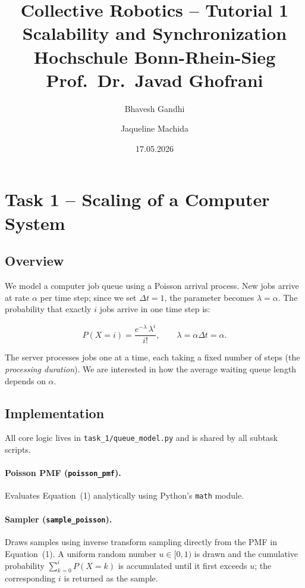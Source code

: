 \documentclass[12pt, a4paper]{article}
\title{
    \vspace{-1cm}
    \textbf{Collective Robotics -- Tutorial 1}\\[0.3em]
    \large Scalability and Synchronization\\[0.5em]
    \normalsize Hochschule Bonn-Rhein-Sieg\\
    Prof.\ Dr.\ Javad Ghofrani
}
\author{Bhavesh Gandhi \and Jaqueline Machida}
\date{17.05.2026}
\begin{document}
\maketitle
\thispagestyle{fancy}
\tableofcontents
\newpage

\section{Task 1 -- Scaling of a Computer System}

\subsection{Overview}

We model a computer job queue using a Poisson arrival process.
New jobs arrive at rate $\alpha$ per time step; since we set $\Delta t = 1$,
the parameter becomes $\lambda = \alpha$.
The probability that exactly $i$ jobs arrive in one time step is:

\begin{equation}
    P(X = i) = \frac{e^{-\lambda}\,\lambda^{i}}{i!}, \qquad \lambda = \alpha \Delta t = \alpha.
\end{equation}

The server processes jobs one at a time, each taking a fixed number of steps
(the \emph{processing duration}).  We are interested in how the average waiting
queue length depends on $\alpha$.

\subsection{Implementation}

All core logic lives in \texttt{task\_1/queue\_model.py} and is shared by all
subtask scripts.

\paragraph{Poisson PMF (\texttt{poisson\_pmf}).}
Evaluates Equation~(1) analytically using Python's \texttt{math} module.

\paragraph{Sampler (\texttt{sample\_poisson}).}
Draws samples using inverse transform sampling directly from the PMF
in Equation~(1).
A uniform random number $u \in [0,1)$ is drawn and the cumulative probability
$\sum_{k=0}^{i} P(X=k)$ is accumulated until it first exceeds $u$; the
corresponding $i$ is returned as the sample.
\end{document}
